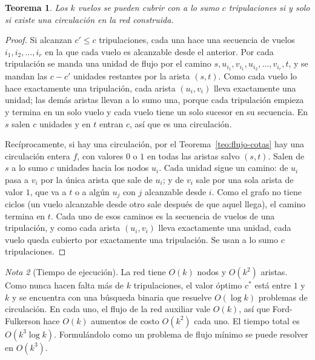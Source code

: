 \documentclass[12pt, spanish, oneside, openany]{book}
\theoremstyle{uprightplain}
\newtheorem{teorema}{Teorema}[section]
\theoremstyle{definition}
\theoremstyle{remark}
\newtheorem{nota}[teorema]{Nota}
\theoremstyle{definition}
\begin{document}
\begin{teorema}
\label{teo:flujo-vuelos}
Los $k$ vuelos se pueden cubrir con a lo sumo $c$ tripulaciones si y solo si existe una circulación en la red construida.
\end{teorema}
\begin{proof}
Si alcanzan $c'\le c$ tripulaciones, cada una hace una secuencia de vuelos $i_1,i_2,\dots,i_r$ en la que cada vuelo es alcanzable desde el anterior. Por cada tripulación se manda una unidad de flujo por el camino $s,u_{i_1},v_{i_1},u_{i_2},\dots,v_{i_r},t$, y se mandan las $c-c'$ unidades restantes por la arista $(s,t)$. Como cada vuelo lo hace exactamente una tripulación, cada arista $(u_i,v_i)$ lleva exactamente una unidad; las demás aristas llevan a lo sumo una, porque cada tripulación empieza y termina en un solo vuelo y cada vuelo tiene un solo sucesor en su secuencia. En $s$ salen $c$ unidades y en $t$ entran $c$, así que es una circulación.

Recíprocamente, si hay una circulación, por el Teorema~\ref{teo:flujo-cotas} hay una circulación entera $f$, con valores $0$ o $1$ en todas las aristas salvo $(s,t)$. Salen de $s$ a lo sumo $c$ unidades hacia los nodos $u_i$. Cada unidad sigue un camino: de $u_i$ pasa a $v_i$ por la única arista que sale de $u_i$; y de $v_i$ sale por una sola arista de valor $1$, que va a $t$ o a algún $u_j$ con $j$ alcanzable desde $i$. Como el grafo no tiene ciclos (un vuelo alcanzable desde otro sale después de que aquel llega), el camino termina en $t$. Cada uno de esos caminos es la secuencia de vuelos de una tripulación, y como cada arista $(u_i,v_i)$ lleva exactamente una unidad, cada vuelo queda cubierto por exactamente una tripulación. Se usan a lo sumo $c$ tripulaciones.
\end{proof}

\begin{nota}[Tiempo de ejecución]
\label{nota:flujo-vuelos-tiempo}
La red tiene $O(k)$ nodos y $O(k^2)$ aristas. Como nunca hacen falta más de $k$ tripulaciones, el valor óptimo $c^{*}$ está entre $1$ y $k$ y se encuentra con una búsqueda binaria que resuelve $O(\log k)$ problemas de circulación. En cada uno, el flujo de la red auxiliar vale $O(k)$, así que Ford-Fulkerson hace $O(k)$ aumentos de costo $O(k^2)$ cada uno. El tiempo total es $O(k^3\log k)$. Formulándolo como un problema de flujo mínimo se puede resolver en $O(k^3)$.
\end{nota}
\end{document}

